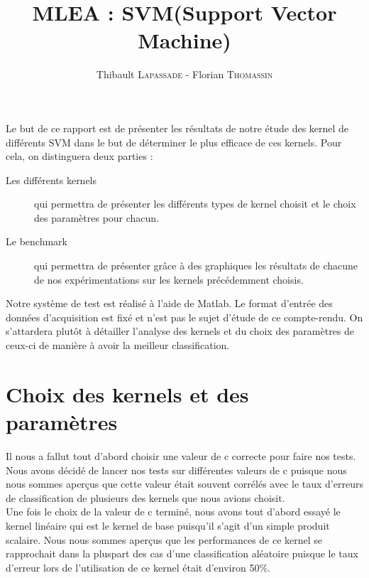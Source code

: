 \documentclass[fontsize=10pt, twoside=no]{scrartcl} %
\begin{document}
\title{MLEA : SVM(Support Vector Machine)}
\author{Thibault \textsc{Lapassade} - Florian \textsc{Thomassin}}
\date{}
\maketitle
\vspace*{-3cm}

\part{}

Le but de ce rapport est de présenter les résultats de notre étude des kernel de différents SVM dans le but de déterminer le plus efficace de ces kernels. Pour cela, on distinguera deux parties :

\begin{description}
\item[Les différents kernels] qui permettra de présenter les différents types de kernel choisit et le choix des paramètres pour chacun.
\item[Le benchmark] qui permettra de présenter grâce à des graphiques les résultats de chacune de nos expérimentations sur les kernels précédemment choisis.
\end{description}

Notre système de test est réalisé à l'aide de Matlab. Le format d'entrée des données d'acquisition est fixé et n'est pas le sujet d'étude de ce compte-rendu. On s'attardera plutôt à détailler l'analyse des kernels et du choix des paramètres de ceux-ci de manière à avoir la meilleur classification.

\part{Choix des kernels et des paramètres}

Il nous a fallut tout d'abord choisir une valeur de c correcte pour faire nos tests. Nous avons décidé de lancer nos tests sur différentes valeurs de c puisque nous nous sommes aperçus que cette valeur était souvent corrélés avec le taux d'erreurs de classification de plusieurs des kernels que nous avions choisit.\\

Une fois le choix de la valeur de c terminé, nous avons tout d'abord essayé le kernel linéaire qui est le kernel de base puisqu'il s'agit d'un simple produit scalaire. Nous nous sommes aperçus que les performances de ce kernel se rapprochait dans la pluspart des cas d'une classification aléatoire puisque le taux d'erreur lors de l'utilisation de ce kernel était d'environ 50{\%}.
\end{document}
